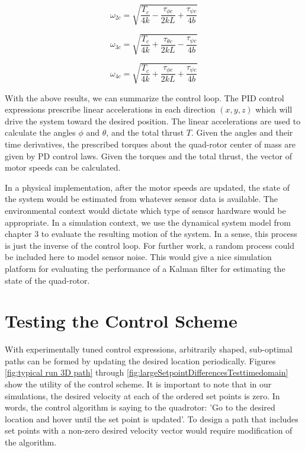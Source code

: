 \begin{equation}
    \omega_{2c} = \sqrt{ \frac{T_c}{4 k} - \frac{ \tau_{\phi c}}{2 k L}   + \frac{ \tau_{\psi c} }{4 b } }
\end{equation}

\begin{equation}
    \omega_{3c} = \sqrt{ \frac{T_c}{4 k} + \frac{ \tau_{\theta c}}{2 k L} - \frac{ \tau_{\psi c} }{4 b } } 
\end{equation}

\begin{equation}
    \omega_{4c} = \sqrt{ \frac{T_c}{4 k} + \frac{ \tau_{\phi c}}{2 k L}   + \frac{ \tau_{\psi c} }{4 b } } 
\end{equation}


With the above results, we can summarize the control loop. The PID control expressions prescribe linear accelerations in each direction $(x,y,z)$ which will drive the system toward the desired position. The linear accelerations are used to calculate the angles $\phi$ and $\theta$, and the total thrust $T$. Given the angles and their time derivatives, the prescribed torques about the quad-rotor center of mass are given by PD control laws. Given the torques and the total thrust, the vector of motor speeds can be calculated.

In a physical implementation, after the motor speeds are updated, the state of the system would be estimated from whatever sensor data is available. The environmental context would dictate which type of sensor hardware would be appropriate. In a simulation context, we use the dynamical system model from chapter 3 to evaluate the resulting motion of the system. In a sense, this process is just the inverse of the control loop. For further work, a random process could be included here to model sensor noise. This would give a nice simulation platform for evaluating the performance of a Kalman filter for estimating the state of the quad-rotor.  

\section{Testing the Control Scheme}

With experimentally tuned control expressions, arbitrarily shaped, sub-optimal paths can be formed by updating the desired location periodically. Figures \ref{fig:typical run 3D path} through \ref{fig:largeSetpointDifferencesTesttimedomain} show the utility of the control scheme. It is important to note that in our simulations, the desired velocity at each of the ordered set points is zero. In words, the control algorithm is saying to the quadrotor: 'Go to the desired location and hover until the set point is updated'. To design a path that includes set points with a non-zero desired velocity vector would require modification of the algorithm.

